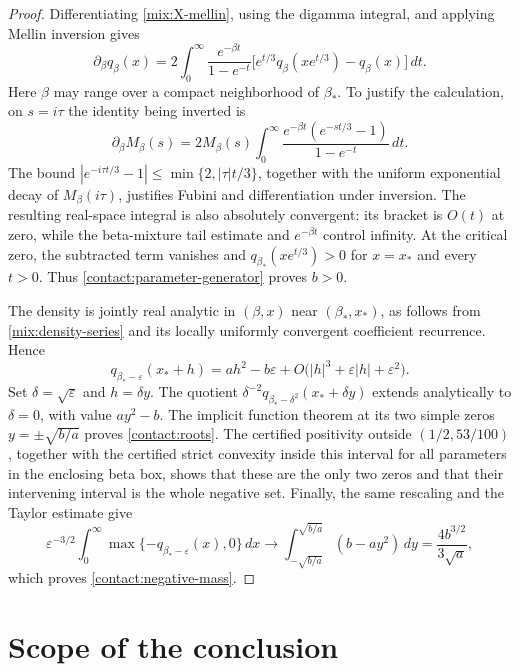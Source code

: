\documentclass[11pt,a4paper]{article}
\numberwithin{equation}{section}
\theoremstyle{definition}\newtheorem{definition}[theorem]{Definition}
\theoremstyle{remark}\newtheorem{remark}[theorem]{Remark}
\begin{document}
\begin{proof}
Differentiating \eqref{mix:X-mellin}, using the digamma integral,
and applying Mellin inversion gives
\begin{equation}\label{contact:parameter-generator}
 \partial_\beta q_\beta(x)
  =2\int_0^\infty\frac{e^{-\beta t}}{1-e^{-t}}
      \bigl[e^{t/3}q_\beta(xe^{t/3})-q_\beta(x)\bigr]\,dt.
\end{equation}
Here \(\beta\) may range over a compact neighborhood of
\(\beta_*\).  To justify the calculation, on \(s=i\tau\) the
identity being inverted is
\[
 \partial_\beta M_\beta(s)
  =2M_\beta(s)\int_0^\infty
       \frac{e^{-\beta t}(e^{-st/3}-1)}{1-e^{-t}}\,dt.
\]
The bound \(|e^{-i\tau t/3}-1|\le\min\{2,|\tau|t/3\}\),
together with the uniform exponential decay of \(M_\beta(i\tau)\),
justifies Fubini and differentiation under inversion.  The resulting
real-space integral is also absolutely convergent: its bracket is
\(O(t)\) at zero, while the beta-mixture tail estimate and
\(e^{-\beta t}\) control infinity.  At the critical zero, the
subtracted term vanishes and \(q_{\beta_*}(xe^{t/3})>0\) for
\(x=x_*\) and every \(t>0\).  Thus \eqref{contact:parameter-generator}
proves \(b>0\).

The density is jointly real analytic in \((\beta,x)\) near
\((\beta_*,x_*)\), as follows from \eqref{mix:density-series} and
its locally uniformly convergent coefficient recurrence.  Hence
\[
 q_{\beta_*-\varepsilon}(x_*+h)
    =ah^2-b\varepsilon
         +O\bigl(|h|^3+\varepsilon|h|+\varepsilon^2\bigr).
\]
Set \(\delta=\sqrt\varepsilon\) and \(h=\delta y\).
The quotient
\(\delta^{-2}q_{\beta_*-\delta^2}(x_*+\delta y)\)
extends analytically to \(\delta=0\), with value \(ay^2-b\).
The implicit function theorem at its two simple zeros
\(y=\pm\sqrt{b/a}\) proves \eqref{contact:roots}.
The certified positivity outside \((1/2,53/100)\), together with
the certified strict convexity inside this interval for all parameters
in the enclosing beta box, shows that these are the only two zeros
and that their intervening interval is the whole negative set.
Finally, the same rescaling and the Taylor estimate give
\[
 \varepsilon^{-3/2}
    \int_0^\infty\max\{-q_{\beta_*-\varepsilon}(x),0\}\,dx
       \longrightarrow
       \int_{-\sqrt{b/a}}^{\sqrt{b/a}}(b-ay^2)\,dy
       =\frac{4b^{3/2}}{3\sqrt a},
\]
which proves \eqref{contact:negative-mass}.
\end{proof}

\section{Scope of the conclusion}
\end{document}
